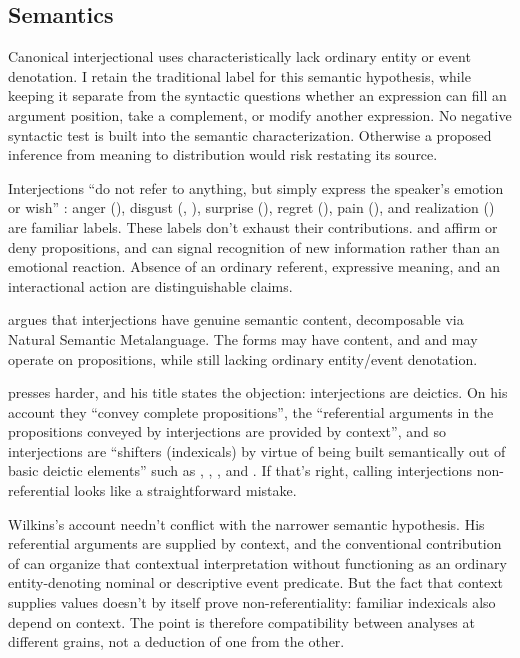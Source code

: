 \documentclass[12pt]{article}
\begin{document}
\subsection{Semantics}\label{sec:semantics}

Canonical interjectional uses characteristically lack ordinary entity or event denotation. I retain the traditional label  for this semantic hypothesis, while keeping it separate from the syntactic questions whether an expression can fill an argument position, take a complement, or modify another expression. No negative syntactic test is built into the semantic characterization. Otherwise a proposed inference from meaning to distribution would risk restating its source.

Interjections \enquote{do not refer to anything, but simply express the speaker's emotion or wish} \citep[57]{leech2006}: anger (), disgust (, ), surprise (), regret (), pain (), and realization () are familiar labels. These labels don't exhaust their contributions.  and  affirm or deny propositions, and  can signal recognition of new information rather than an emotional reaction. Absence of an ordinary referent, expressive meaning, and an interactional action are distinguishable claims.

\textcite[159]{wierzbicka1992} argues that interjections have genuine semantic content, decomposable via Natural Semantic Metalanguage. The forms may have content, and  and  may operate on propositions, while still lacking ordinary entity/event denotation.

\textcite[119]{wilkins1992} presses harder, and his title states the objection: interjections are deictics. On his account they \enquote{convey complete propositions}, the \enquote{referential arguments in the propositions conveyed by interjections are provided by context}, and so interjections are \enquote{shifters (indexicals) by virtue of being built semantically out of basic deictic elements} such as , , , and . If that's right, calling interjections non-referential looks like a straightforward mistake.

Wilkins's account needn't conflict with the narrower semantic hypothesis. His referential arguments are supplied by context, and the conventional contribution of  can organize that contextual interpretation without functioning as an ordinary entity-denoting nominal or descriptive event predicate. But the fact that context supplies values doesn't by itself prove non-referentiality: familiar indexicals also depend on context. The point is therefore compatibility between analyses at different grains, not a deduction of one from the other.
\end{document}
